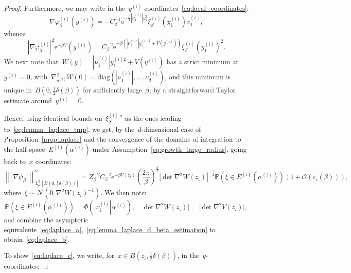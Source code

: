 \documentclass[10pt]{article}
\newcommand{\e}{\mathrm{e}}
\renewcommand{\P}{\mathbb{P}}
\newcommand{\1}{\mathbbm 1}
\newcommand{\largeRadius}{\delta}
\newcommand{\epsLimit}[1]{\alpha^{(#1)}} %
\newcommand{\hessEigvec}[2]{v^{(#1)}_{#2}} %
\newcommand{\hessEigval}[2]{\nu^{(#1)}_{#2}} %
\newcommand{\halfSpace}[1]{E^{(#1)}}
\newcommand{\fineCutoff}[1]{\xi_\beta^{(#1)}}
\renewcommand{\O}{\mathcal{O}}
\begin{document}
\begin{proof}
            Furthermore, we may write in the~$y^{(i)}$-coordinates~\eqref{eq:local_coordinates}:
            \begin{equation}
                \label{eq:varphi_grad}
                \nabla \varphi_\beta^{(i)}(y^{(i)}) = -C_\beta^{-1}\e^{-\frac{\beta}2|\hessEigval{i}{1}|y_1^2}\fineCutoff{i}(y^{(i)}_1)\hessEigvec{i}{1},
            \end{equation}
            whence
            \[|\nabla\varphi_\beta^{(i)}|^2\e^{-\beta V}(y^{(i)}) = C_\beta^{-2}\e^{-\beta\left(|\hessEigval{i}{1}|y^{(i)2}_1+ V(y^{(i)})\right)}\fineCutoff{i}(y^{(i)}_1)^2.\]
            We next note that~$W(y)=|\hessEigval{i}{1}|y^{(i)2}_1+ V(y^{(i)})$ has a strict minimum at~$y^{(i)}=0$, with~${\nabla_{y^{(i)}}^2 W(0) = \mathrm{diag}\left(|\hessEigval{i}{1}|,\dots, \hessEigval{i}{d}\right)}$, and this minimum is unique in~$B\left(0,\frac12\largeRadius(\beta)\right)$ for sufficiently large~$\beta$, by a straightforward Taylor estimate around~$y^{(i)}=0$.

            Hence, using identical bounds on~$\fineCutoff{i}\,^2$ as the ones leading to~\eqref{eq:lemma_laplace_tmp}, we get, by the~$d$-dimensional case of Proposition~\ref{prop:laplace} and the convergence of the domains of integration to the half-space~$\halfSpace{i}(\epsLimit{i})$ under Assumption~\eqref{eq:growth_large_radius}, going back to~$x$ coordinates:
            \[\left\||\nabla \psi_\beta|\right\|^2_{L^2_\mu\left[B\left(0,\frac12\largeRadius(\beta)\right)\right]} = Z_\beta^{-2}C_\beta^{-2}\e^{-\beta V(z_i)}\left(\frac{2\pi}{\beta}\right)^{\frac d2}|\det \nabla^2 W(z_i)|^{-\frac12}\P(\xi\in \halfSpace{i}(\epsLimit{i}))(1+\O(\varepsilon_i(\beta))),\]
            where~$\xi\sim\mathcal N(0,\nabla^2 W(z_i)^{-1})$. We then note:
            \[\P(\xi\in \halfSpace{i}(\epsLimit{i})) = \Phi(|\hessEigval{i}{1}|\epsLimit{i}),\quad \det \nabla^2 W(z_i)|=|\det\nabla^2 V(z_i)|,\]
            and combine the asymptotic equivalents~\eqref{eq:laplace_a},~\eqref{eq:lemma_laplace_d_beta_estimation} to obtain~\eqref{eq:laplace_b}.

            To show~\eqref{eq:laplace_c}, we write, for~$x \in B\left(z_i,\frac12\largeRadius(\beta)\right)$, in the~$y$-coordinates:


\end{proof}
\end{document}
